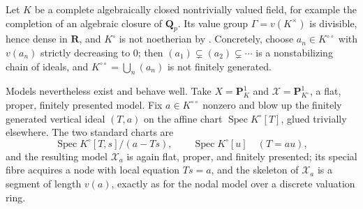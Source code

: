 \begin{example}
\label{ex:model-dense-value-group}
Let $K$ be a complete algebraically closed nontrivially valued field, for
example the completion of an algebraic closure of $\mathbf Q_p$.  Its value
group $\Gamma=v(K^\times)$ is divisible, hence dense in $\mathbf R$, and
$K^\circ$ is not noetherian by .
Concretely, choose $a_n\in K^{\circ\circ}$ with $v(a_n)$ strictly
decreasing to $0$; then $(a_1)\subsetneq(a_2)\subsetneq\cdots$ is a
nonstabilizing chain of ideals, and
$K^{\circ\circ}=\bigcup_n(a_n)$ is not finitely generated.

Models nevertheless exist and behave well.  Take
$X=\mathbf P^1_K$ and $\mathcal X=\mathbf P^1_{K^\circ}$, a flat, proper,
finitely presented model.  Fix $a\in K^{\circ\circ}$ nonzero and blow up
the finitely generated vertical ideal $(T,a)$ on the affine chart
$\operatorname{Spec}K^\circ[T]$, glued trivially elsewhere.  The two
standard charts are
\[
 \operatorname{Spec}K^\circ[T,s]/(a-Ts),
 \qquad
 \operatorname{Spec}K^\circ[u]\quad(T=au),
\]
and the resulting model $\mathcal X_a$ is again flat, proper, and finitely
presented; its special fibre acquires a node with local equation $Ts=a$,
and the skeleton of $\mathcal X_a$ is a segment of length $v(a)$, exactly
as for the nodal model over a discrete valuation ring.


\end{example}
